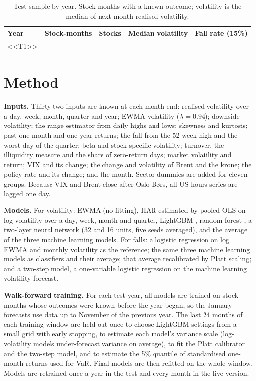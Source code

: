 \documentclass[11pt,a4paper]{article}
\begin{document}
\begin{table}[H]\centering\small
\caption{Test sample by year. Stock-months with a known outcome; volatility is the median of next-month realised volatility.}
\label{tab:sample}
\begin{tabular}{lrrrr}\toprule
Year & Stock-months & Stocks & Median volatility & Fall rate (15\%) \\\midrule
<<T1>>
\bottomrule\end{tabular}
\end{table}

\section{Method}
\textbf{Inputs.} Thirty-two inputs are known at each month end: realised volatility over a day, week, month, quarter and year; EWMA volatility ($\lambda=0.94$); downside volatility; the \citet{parkinson1980} range estimator from daily highs and lows; skewness and kurtosis; past one-month and one-year returns; the fall from the 52-week high and the worst day of the quarter; beta and stock-specific volatility; turnover, the \citet{amihud2002} illiquidity measure and the share of zero-return days; market volatility and return; VIX and its change; the change and volatility of Brent and the krone; the policy rate and its change; and the month. Sector dummies are added for eleven groups. Because VIX and Brent close after Oslo Børs, all US-hours series are lagged one day.

\textbf{Models.} For volatility: EWMA (no fitting), HAR estimated by pooled OLS on log volatility over a day, week, month and quarter, LightGBM \citep{ke2017}, random forest \citep{breiman2001}, a two-layer neural network (32 and 16 units, five seeds averaged), and the average of the three machine learning models. For falls: a logistic regression on log EWMA and monthly volatility as the reference; the same three machine learning models as classifiers and their average; that average recalibrated by Platt scaling; and a two-step model, a one-variable logistic regression on the machine learning volatility forecast.

\textbf{Walk-forward training.} For each test year, all models are trained on stock-months whose outcomes were known before the year began, so the January forecasts use data up to November of the previous year. The last 24 months of each training window are held out once to choose LightGBM settings from a small grid with early stopping, to estimate each model's variance scale (log-volatility models under-forecast variance on average), to fit the Platt calibrator and the two-step model, and to estimate the 5\% quantile of standardised one-month returns used for VaR. Final models are then refitted on the whole window. Models are retrained once a year in the test and every month in the live version.
\end{document}
